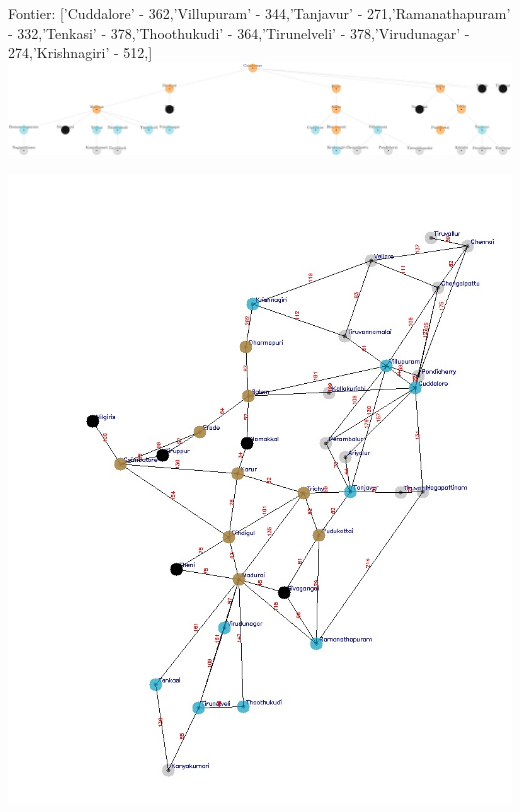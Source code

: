 \documentclass[xcolor=table]{beamer}
\begin{document}
\begin{frame}
  { \tiny Fontier: ['Cuddalore' - 362,'Villupuram' - 344,'Tanjavur' - 271,'Ramanathapuram' - 332,'Tenkasi' - 378,'Thoothukudi' - 364,'Tirunelveli' - 378,'Virudunagar' - 274,'Krishnagiri' - 512,]}
  \includegraphics[width=1\textwidth]{../UCSNodes/21-1.png}
  \begin{center}
    \includegraphics[height=0.55\textheight]{../UCSoutput/tamilUCS19.jpg}
  \end{center}
\end{frame}
\end{document}
